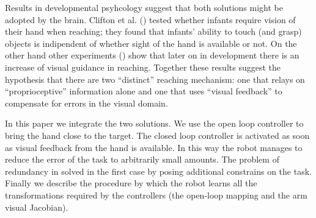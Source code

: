 Results in developmental psyhcology suggest that both solutions might be
adopted by the brain. Clifton et al. (\cite{clifton93isvisually}) 
tested whether infants require vision of their hand when reaching; they 
found that infants' ability to touch (and grasp) objects is indipendent 
of whether sight of the hand is available or not. On the other hand 
other experiments (\cite{ashmead93visual}) 
show that later on in development there is an increase of visual guidance 
in reaching. Together these results suggest the hypothesis that there 
are two ``distinct'' reaching mechanism: one that relays on ``proprioceptive'' 
information alone and one that uses ``visual feedback'' to compensate 
for errors in the visual domain.

In this paper we integrate the two solutions. We use the open loop
controller to bring the hand close to the target. The closed loop controller 
is activated as soon as visual feedback from the hand is available. In this
way the robot manages to reduce the error of the task to arbitrarily small 
amounts. The problem of redundancy in solved in the first case by posing 
additional constrains on the task. Finally we describe the procedure by 
which the robot learns all the transformations required by the controllers 
(the open-loop mapping and the arm visual Jacobian).